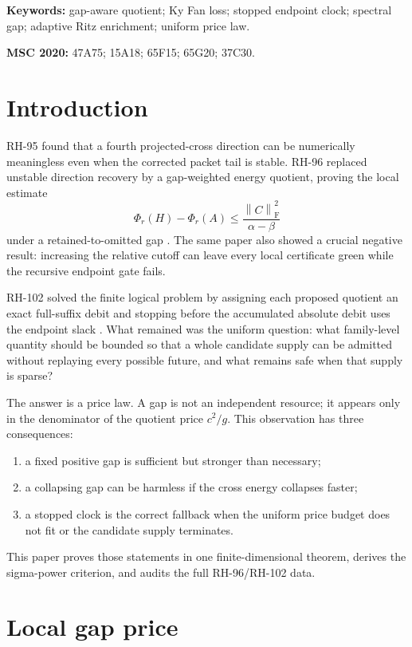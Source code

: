 \documentclass[11pt]{article}
\theoremstyle{definition}
\theoremstyle{remark}
\newcommand{\norm}[1]{\left\lVert#1\right\rVert}
\newcommand{\F}{\mathrm F}
\begin{document}
\noindent\textbf{Keywords:} gap-aware quotient; Ky Fan loss; stopped endpoint
clock; spectral gap; adaptive Ritz enrichment; uniform price law.

\medskip
\noindent\textbf{MSC 2020:} 47A75; 15A18; 65F15; 65G20; 37C30.

\section{Introduction}

RH-95 found that a fourth projected-cross direction can be numerically
meaningless even when the corrected packet tail is stable.  RH-96 replaced
unstable direction recovery by a gap-weighted energy quotient, proving the
local estimate
\[
 \Phi_r(H)-\Phi_r(A)\le\frac{\norm C_{\F}^2}{\alpha-\beta}
 \]
under a retained-to-omitted gap \citep{WangWeakQuotient2026}.  The same paper
also showed a crucial negative result: increasing the relative cutoff can
leave every local certificate green while the recursive endpoint gate fails.

RH-102 solved the finite logical problem by assigning each proposed quotient
an exact full-suffix debit and stopping before the accumulated absolute debit
uses the endpoint slack \citep{WangStoppedClock2026}.  What remained was the
uniform question: what family-level quantity should be bounded so that a
whole candidate supply can be admitted without replaying every possible
future, and what remains safe when that supply is sparse?

The answer is a price law.  A gap is not an independent resource; it appears
only in the denominator of the quotient price $c^2/g$.  This observation has
three consequences:
\begin{enumerate}[leftmargin=2.2em]
 \item a fixed positive gap is sufficient but stronger than necessary;
 \item a collapsing gap can be harmless if the cross energy collapses faster;
 \item a stopped clock is the correct fallback when the uniform price budget
       does not fit or the candidate supply terminates.
\end{enumerate}

This paper proves those statements in one finite-dimensional theorem, derives
the sigma-power criterion, and audits the full RH-96/RH-102 data.

\section{Local gap price}
\label{sec:local}
\end{document}
